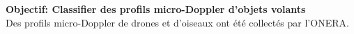 \documentclass[a0,portrait]{a0poster}
\begin{document}
\vspace{1cm} %


\begin{multicols}{2} %





\begin{tcolorbox}[colback=blue!5!lime,colframe=green!75!black,title={\section*{Contexte}}]
\textbf{Objectif: Classifier des profils micro-Doppler d'objets volants}\\
Des profils micro-Doppler de drones et d'oiseaux ont été collectés par l'ONERA.\\
\end{tcolorbox}




\end{multicols}
\end{document}
